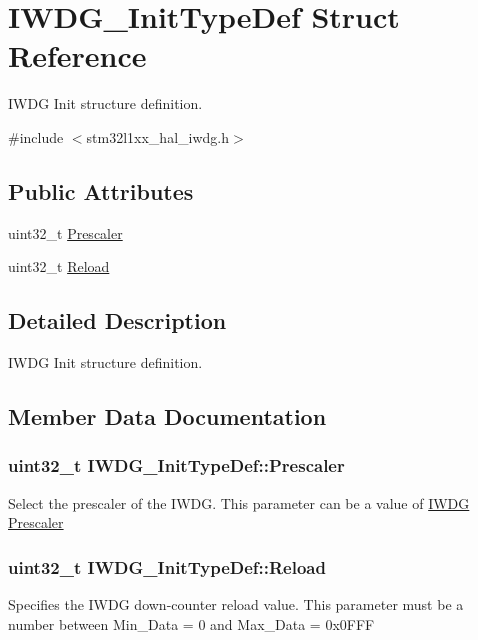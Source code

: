 \hypertarget{struct_i_w_d_g___init_type_def}{\section{I\-W\-D\-G\-\_\-\-Init\-Type\-Def Struct Reference}
\label{struct_i_w_d_g___init_type_def}
}


I\-W\-D\-G Init structure definition.  




{\ttfamily \#include $<$stm32l1xx\-\_\-hal\-\_\-iwdg.\-h$>$}

\subsection*{Public Attributes}
\begin{DoxyCompactItemize}
\item 
uint32\-\_\-t \hyperlink{struct_i_w_d_g___init_type_def_adb8ce67e656492f5ac26473bb70c5daa}{Prescaler}
\item 
uint32\-\_\-t \hyperlink{struct_i_w_d_g___init_type_def_af5a275e4c73292039258a0287fb7901d}{Reload}
\end{DoxyCompactItemize}


\subsection{Detailed Description}
I\-W\-D\-G Init structure definition. 

\subsection{Member Data Documentation}
\hypertarget{struct_i_w_d_g___init_type_def_adb8ce67e656492f5ac26473bb70c5daa}{
\subsubsection[{Prescaler}]{\setlength{\rightskip}{0pt plus 5cm}uint32\-\_\-t I\-W\-D\-G\-\_\-\-Init\-Type\-Def\-::\-Prescaler}}\label{struct_i_w_d_g___init_type_def_adb8ce67e656492f5ac26473bb70c5daa}
Select the prescaler of the I\-W\-D\-G. This parameter can be a value of \hyperlink{group___i_w_d_g___prescaler}{I\-W\-D\-G Prescaler} \hypertarget{struct_i_w_d_g___init_type_def_af5a275e4c73292039258a0287fb7901d}{
\subsubsection[{Reload}]{\setlength{\rightskip}{0pt plus 5cm}uint32\-\_\-t I\-W\-D\-G\-\_\-\-Init\-Type\-Def\-::\-Reload}}\label{struct_i_w_d_g___init_type_def_af5a275e4c73292039258a0287fb7901d}
Specifies the I\-W\-D\-G down-\/counter reload value. This parameter must be a number between Min\-\_\-\-Data = 0 and Max\-\_\-\-Data = 0x0\-F\-F\-F 

